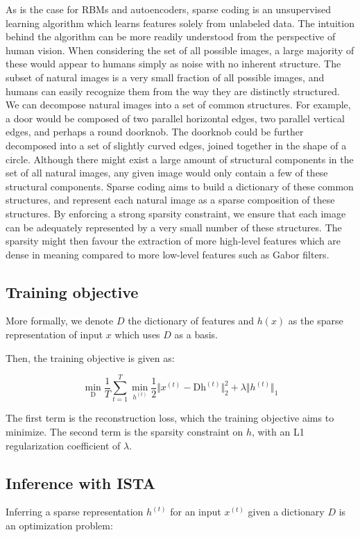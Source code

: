 \documentclass{article} %
\begin{document}
As is the case for RBMs and autoencoders, sparse coding is an unsupervised learning algorithm which learns features solely from unlabeled data. The intuition behind the algorithm can be more readily understood from the perspective of human vision. When considering the set of all possible images, a large majority of these would appear to humans simply as noise with no inherent structure. The subset of natural images is a very small fraction of all possible images, and humans can easily recognize them from the way they are distinctly structured. We can decompose natural images into a set of common structures. For example, a door would be composed of two parallel horizontal edges, two parallel vertical edges, and perhaps a round doorknob. The doorknob could be further decomposed into a set of slightly curved edges, joined together in the shape of a circle. Although there might exist a large amount of structural components in the set of all natural images, any given image would only contain a few of these structural components. Sparse coding aims to build a dictionary of these common structures, and represent each natural image as a sparse composition of these structures. By enforcing a strong sparsity constraint, we ensure that each image can be adequately represented by a very small number of these structures. The sparsity might then favour the extraction of more high-level features which are dense in meaning compared to more low-level features such as Gabor filters.

\subsection{Training objective}
More formally, we denote $D$ the dictionary of features and $h(x)$ as the sparse representation of input $x$ which uses $D$ as a basis.

Then, the training objective is given as:

\begin{equation}
\min_{\text{D}} \frac{1}{T} \sum_{t=1}^{T} \min_{h^{(t)}} \frac{1}{2} \Vert x^{(t)} - \text{D} \text{h}^{(t)} \Vert_{2}^{2} + \lambda \Vert h^{(t)} \Vert_{1}
\end{equation}

The first term is the reconstruction loss, which the training objective aims to minimize. The second term is the sparsity constraint on $h$, with an L1 regularization coefficient of $\lambda$.

\subsection{Inference with ISTA}
Inferring a sparse representation $h^{(t)}$ for an input $x^{(t)}$ given a dictionary $D$ is an optimization problem:
\end{document}
